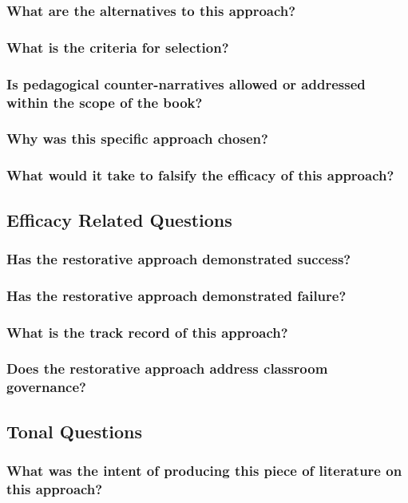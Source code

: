 \documentclass[12pt]{article}
\begin{document}
  \subsubsection{What are the alternatives to this approach?}
  \subsubsection{What is the criteria for selection?}
  \subsubsection{Is pedagogical counter-narratives allowed or addressed within the scope of the book?}
  \subsubsection{Why was this specific approach chosen?}
  \subsubsection{What would it take to falsify the efficacy of this approach?}
  \subsection{Efficacy Related Questions}
  \subsubsection{Has the restorative approach demonstrated success?}
  \subsubsection{Has the restorative approach demonstrated failure?}
  \subsubsection{What is the track record of this approach?}
  \subsubsection{Does the restorative approach address classroom governance?}
  \subsection{Tonal Questions}
  \subsubsection{What was the intent of producing this piece of literature on this approach?}
\end{document}
